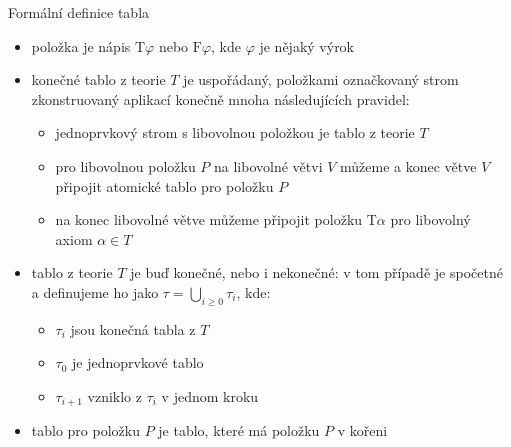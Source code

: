 \documentclass{beamer}
\begin{document}
\begin{frame}{Formální definice tabla}

    \begin{itemize}
        \item \alert{položka} je nápis $\mathrm{T}\varphi$ nebo $\mathrm{F}\varphi$, kde $\varphi$ je nějaký výrok
        \item \alert{konečné tablo z teorie $T$} je uspořádaný, položkami označkovaný strom zkonstruovaný aplikací konečně mnoha následujících pravidel:
        \begin{itemize}
            \item jednoprvkový strom s libovolnou položkou je tablo z teorie $T$
            \item pro libovolnou položku $P$ na libovolné větvi $V$ můžeme a konec větve $V$ připojit atomické tablo pro položku $P$
            \item na konec libovolné větve můžeme připojit položku $\mathrm{T}\alpha$ pro libovolný axiom $\alpha\in T$
        \end{itemize}
        \item \alert{tablo z teorie $T$} je buď konečné, nebo i nekonečné: v tom případě je spočetné a definujeme ho jako $\tau=\bigcup_{i\geq 0}\tau_i$, kde:
        \begin{itemize}
            \item $\tau_i$ jsou konečná tabla z $T$
            \item $\tau_0$ je jednoprvkové tablo
            \item $\tau_{i+1}$ vzniklo z $\tau_i$ v jednom kroku
        \end{itemize}
        \item \alert{tablo pro položku $P$} je tablo, které má položku $P$ v kořeni
    \end{itemize}

\end{frame}
\end{document}
